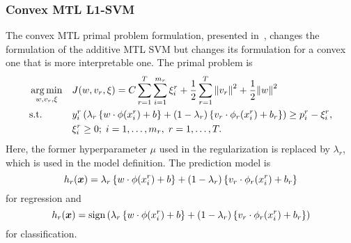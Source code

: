 \subsubsection{{Convex} MTL L1-SVM}
The {convex} MTL primal problem formulation, presented in~\cite{RuizAD19}, changes the formulation of the {additive} MTL SVM but changes its formulation for a convex one that is more interpretable one. The primal problem is
\begin{equation}\label{eq:svmmtl_primal_convex}
    \begin{aligned}
    & \argmin_{w, {v}_r, \xi}
    & & {J({w}, {v}_r, \xi) = C \sum_{r= 1}^T \sum_{i=1}^{m_r} {\xi_{i}^r} + \frac{1}{2} \sum_{r= 1}^T{\norm{{v}_r}^2} + \frac{1}{2} {\norm{{w}}}^2} \\
    & \text{s.t.}
    & & y_{i}^r \left(\lambda_r \left\lbrace {w} \cdot \phi(x_{i}^r) + b  \right\rbrace + (1 - \lambda_r) \left\lbrace {v}_r \cdot \phi_r(x_{i}^r) + b_r \right\rbrace  \right) \geq p_{i}^r - \xi_{i}^r ,  \\
    & & & \xi_{i}^r \geq 0; \;  i=1 , \dotsc , m_r, \;  r= 1,\dotsc, T  . \\
    \end{aligned}
\end{equation}
Here, the former hyperparameter $\mu$ used in the regularization is replaced by $\lambda_r$, which is used in the model definition. The prediction model is
\begin{equation}
    \nonumber
    h_r(\bm{x}) = \lambda_r \left\lbrace {w} \cdot \phi(x_{i}^r) + b  \right\rbrace + (1 - \lambda_r) \left\lbrace {v}_r \cdot \phi_r(x_{i}^r) + b_r \right\rbrace
\end{equation}
for regression and 
\begin{equation}
    \nonumber
    h_r(\bm{x}) = \operatorname{sign}{ \left(\lambda_r \left\lbrace {w} \cdot \phi(x_{i}^r) + b  \right\rbrace + (1 - \lambda_r) \left\lbrace {v}_r \cdot \phi_r(x_{i}^r) + b_r \right\rbrace \right)}
\end{equation}
for classification.
%

